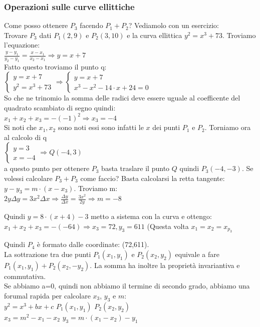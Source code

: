\documentclass[10pt,a4paper]{article}
\begin{document}
\subsubsection{Operazioni sulle curve ellittiche}
Come posso ottenere $P_3$ facendo $P_1+P_2$? Vediamolo con un esercizio:\\
Trovare $P_3$ dati $P_1(2,9)$ e $P_2(3,10)$ e la curva ellittica $y^2=x^3+73$. Troviamo l'equazione:\\
$\frac{y-y_1}{y_2-y_1}=\frac{x-x_1}{x_2-x_1} \Rightarrow y=x+7$\\
Fatto questo troviamo il punto q:\\
$\begin{cases}
y=x+7 \\
y^2=x^3+73
\end{cases}\Rightarrow
\begin{cases}
y=x+7 \\
x^3-x^2-14\cdot x+24=0
\end{cases}
$\\
So che ne trinomio la somma delle radici deve essere uguale al coefficente del quadrato scambiato di segno quindi:\\
$x_1+x_2+x_3=-(-1)^2 \Rightarrow x_3=-4$\\
Si noti che $x_1,x_2$ sono noti essi sono infatti le $x$ dei punti $P_1$ e $P_2$. Torniamo ora al calcolo di q\\
$\begin{cases}
y=3 \\
x=-4
\end{cases}\Rightarrow Q(-4,3)$\\

a questo punto per ottenere $P_3$ basta traslare il punto $Q$ quindi $P_3(-4,-3)$. Se volessi calcolare $P_3+P_3$ come faccio? Basta calcolarsi la retta tangente: $y-y_3=m\cdot(x-x_3)$. Troviamo m:\\

$2y\Delta y=3x^2\Delta x \Rightarrow \frac{\Delta y}{\Delta x} = \frac{3x^2}{2y} \Rightarrow m=-8$

Quindi $y=8\cdot(x+4)-3$ metto a sistema con la curva e ottengo:\\
$x_1+x_2+x_3=-(-64) \Rightarrow x_3=72, y_3=611$ (Questa volta $x_1=x_2=x_{p_3}$

Quindi $P_4$ è formato dalle coordinate: (72,611).\\
La sottrazione tra due punti $P_1(x_1,y_1)$ e $P_2(x_2,y_2)$ equivale a fare $P_1(x_1,y_1)+P_2(x_2,-y_2)$. La somma ha inoltre la proprietà invariantiva e commutativa.\\
Se abbiamo a=0, quindi non abbiamo il termine di secondo grado, abbiamo una forumal rapida per calcolare $x_3$, $y_3$ e $m$:\\
$y^2=x^3+bx+c$ $P_1(x_1,y_1)$ $P_2(x_2,y_2)$\\
$x_3=m^2-x_1-x_2$
$y_3=m\cdot(x_1-x_2)-y_1$
\end{document}
